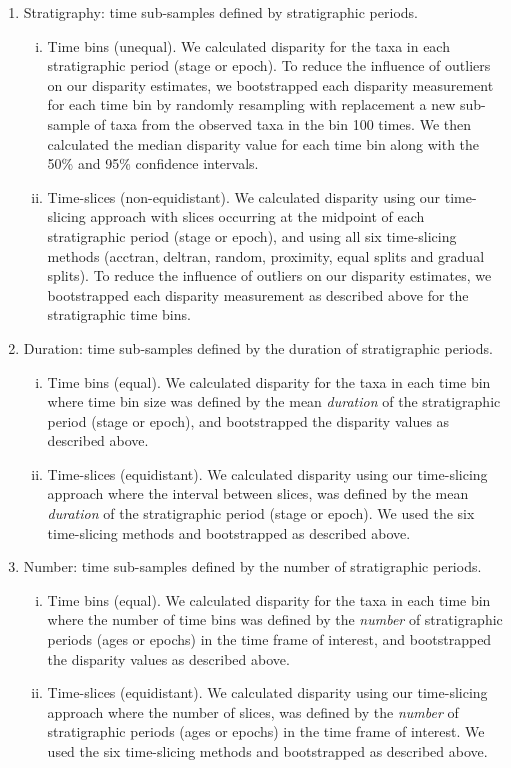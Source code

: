 \documentclass[12pt,a4paper]{article}
\begin{document}
\begin{enumerate}
  \item Stratigraphy: time sub-samples defined by stratigraphic periods. 
  \begin{enumerate}[(i)]
    \item Time bins (unequal). 
    We calculated disparity for the taxa in each stratigraphic period (stage or epoch). 
    To reduce the influence of outliers on our disparity estimates, we bootstrapped each disparity measurement for each time bin by randomly resampling with replacement a new sub-sample of taxa from the observed taxa in the bin 100 times.
    We then calculated the median disparity value for each time bin along with the 50\% and 95\% confidence intervals.
    \item Time-slices (non-equidistant).
    We calculated disparity using our time-slicing approach with slices occurring at the midpoint of each stratigraphic period (stage or epoch), and using all six time-slicing methods (acctran, deltran, random, proximity, equal splits and gradual splits).
    To reduce the influence of outliers on our disparity estimates, we bootstrapped each disparity measurement as described above for the stratigraphic time bins.
    \end{enumerate}

  \item Duration: time sub-samples defined by the duration of stratigraphic periods. 
  \begin{enumerate}[(i)]
    \item Time bins (equal). 
    We calculated disparity for the taxa in each time bin where time bin size was defined by the mean \textit{duration} of the stratigraphic period (stage or epoch), and bootstrapped the disparity values as described above.
    \item Time-slices (equidistant).
    We calculated disparity using our time-slicing approach where the interval between slices, was defined by the mean \textit{duration} of the stratigraphic period (stage or epoch).
    We used the six time-slicing methods and bootstrapped as described above.
  \end{enumerate}

  \item Number: time sub-samples defined by the number of stratigraphic periods. 
  \begin{enumerate}[(i)]
    \item Time bins (equal). 
    We calculated disparity for the taxa in each time bin where the number of time bins was defined by the \textit{number} of stratigraphic periods (ages or epochs) in the time frame of interest, and bootstrapped the disparity values as described above.
    \item Time-slices (equidistant).
    We calculated disparity using our time-slicing approach where the number of slices, was defined by the \textit{number} of stratigraphic periods (ages or epochs) in the time frame of interest.
    We used the six time-slicing methods and bootstrapped as described above.
  \end{enumerate}

\end{enumerate}
\end{document}

